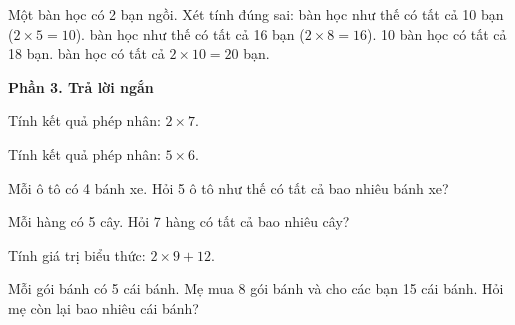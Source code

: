 \begin{ex} %
Một bàn học có 2 bạn ngồi. Xét tính đúng sai:
\choiceTF
{ bàn học như thế có tất cả 10 bạn ($2 \times 5 = 10$).}
{ bàn học như thế có tất cả 16 bạn ($2 \times 8 = 16$).}
{10 bàn học có tất cả 18 bạn.}
{ bàn học có tất cả $2 \times 10 = 20$ bạn.}
\end{ex}

\textbf{Phần 3. Trả lời ngắn}

\begin{ex} %
Tính kết quả phép nhân: $2 \times 7$.
\end{ex}

\begin{ex} %
Tính kết quả phép nhân: $5 \times 6$.
\end{ex}

\begin{ex} %
Mỗi ô tô có 4 bánh xe. Hỏi 5 ô tô như thế có tất cả bao nhiêu bánh xe?
\end{ex}

\begin{ex} %
Mỗi hàng có 5 cây. Hỏi 7 hàng có tất cả bao nhiêu cây?
\end{ex}

\begin{ex} %
Tính giá trị biểu thức: $2 \times 9 + 12$.
\end{ex}

\begin{ex} %
Mỗi gói bánh có 5 cái bánh. Mẹ mua 8 gói bánh và cho các bạn 15 cái bánh. Hỏi mẹ còn lại bao nhiêu cái bánh?
\end{ex}

